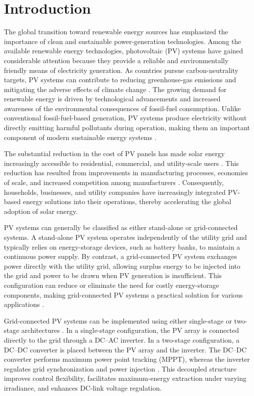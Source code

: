 \documentclass[preprint,12pt]{elsarticle}
\begin{document}
\section{Introduction}
\label{sec:introduction}

The global transition toward renewable energy sources has emphasized the importance of clean and sustainable power-generation technologies. Among the available renewable energy technologies, photovoltaic (PV) systems have gained considerable attention because they provide a reliable and environmentally friendly means of electricity generation. As countries pursue carbon-neutrality targets, PV systems can contribute to reducing greenhouse-gas emissions and mitigating the adverse effects of climate change \cite{esram2007comparison}. The growing demand for renewable energy is driven by technological advancements and increased awareness of the environmental consequences of fossil-fuel consumption. Unlike conventional fossil-fuel-based generation, PV systems produce electricity without directly emitting harmful pollutants during operation, making them an important component of modern sustainable energy systems \cite{saleh2024challenges}.

The substantial reduction in the cost of PV panels has made solar energy increasingly accessible to residential, commercial, and utility-scale users \cite{nikolina2016international,khan2024economics}. This reduction has resulted from improvements in manufacturing processes, economies of scale, and increased competition among manufacturers \cite{esram2007comparison}. Consequently, households, businesses, and utility companies have increasingly integrated PV-based energy solutions into their operations, thereby accelerating the global adoption of solar energy.

PV systems can generally be classified as either stand-alone or grid-connected systems. A stand-alone PV system operates independently of the utility grid and typically relies on energy-storage devices, such as battery banks, to maintain a continuous power supply. By contrast, a grid-connected PV system exchanges power directly with the utility grid, allowing surplus energy to be injected into the grid and power to be drawn when PV generation is insufficient. This configuration can reduce or eliminate the need for costly energy-storage components, making grid-connected PV systems a practical solution for various applications \cite{carrasco2006power}.

Grid-connected PV systems can be implemented using either single-stage or two-stage architectures \cite{trujillo2016modeling}. In a single-stage configuration, the PV array is connected directly to the grid through a DC--AC inverter. In a two-stage configuration, a DC--DC converter is placed between the PV array and the inverter. The DC--DC converter performs maximum power point tracking (MPPT), whereas the inverter regulates grid synchronization and power injection \cite{kouro2015grid}. This decoupled structure improves control flexibility, facilitates maximum-energy extraction under varying irradiance, and enhances DC-link voltage regulation.
\end{document}
